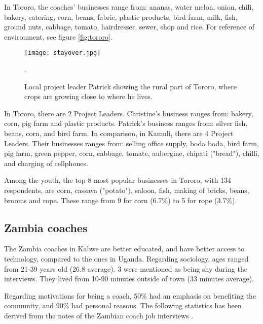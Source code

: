 In Tororo, the coaches' businesses range from: ananas, water melon, onion, chili, bakery, catering, corn, beans, fabric, plastic products, bird farm, milk, fish, ground nuts, cabbage, tomato, hairdresser, sewer, shop and rice. For reference of environment, see figure \ref{fig:tororo}.

\begin{figure}[h]
    \centering
    \texttt{[image: stayover.jpg]}
    \caption{Local project leader Patrick showing the rural part of Tororo, where crops are growing close to where he lives.}.
    \label{fig:duolingo}
\end{figure}

In Tororo, there are 2 Project Leaders. Christine's business ranges from: bakery, corn, pig farm and plastic products. Patrick's business ranges from: silver fish, beans, corn, and bird farm. In comparison, in Kamuli, there are 4 Project Leaders. Their businesses ranges from: selling office supply, boda boda, bird farm, pig farm, green pepper, corn, cabbage, tomate, aubergine, chipati ("bread"), chilli, and charging of cellphones.

Among the youth, the top 8 most popular businesses in Tororo, with 134 respondents, are corn, cassava ("potato"), saloon, fish, making of bricks, beans, brooms and rope. These range from 9 for corn (6.7\%) to 5 for rope (3.7\%).

\subsection{Zambia coaches}
The Zambia coaches in Kabwe are better educated, and have better access to technology, compared to the ones in Uganda. Regarding sociology, ages ranged from 21-39 years old (26.8 average). 3 were mentioned as being shy during the interviews. They lived from 10-90 minutes outside of town (33 minutes average).

Regarding motivations for being a coach, 50\% had an emphasis on benefiting the community, and 90\% had personal reasons. The following statistics has been derived from the notes of the Zambian coach job interviews \citep{yd-zambia-interviews}.

%

